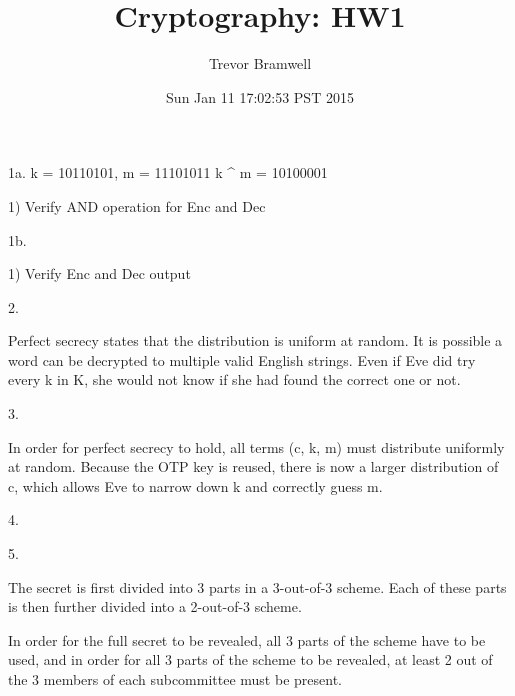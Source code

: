 \documentclass[12pt]{article}
\title{Cryptography: HW1}
\author{Trevor Bramwell}
\date{Sun Jan 11 17:02:53 PST 2015}
\begin{document}
\maketitle

1a. k = 10110101, m = 11101011
    k ^ m = 10100001

    1) Verify AND operation for Enc and Dec

1b.

    1) Verify Enc and Dec output

2.

Perfect secrecy states that the distribution is uniform at random. It
is possible a word can be decrypted to multiple valid English strings.
Even if Eve did try every k in K, she would not know if she had found
the correct one or not.

3. 

In order for perfect secrecy to hold, all terms (c, k, m) must
distribute uniformly at random. Because the OTP key is reused, there is
now a larger distribution of c, which allows Eve to narrow down k and
correctly guess m.

4. 


5.

The secret is first divided into 3 parts in a 3-out-of-3 scheme. Each
of these parts is then further divided into a 2-out-of-3 scheme.

In order for the full secret to be revealed, all 3 parts of the scheme
have to be used, and in order for all 3 parts of the scheme to be
revealed, at least 2 out of the 3 members of each subcommittee must be
present.
\end{document}
